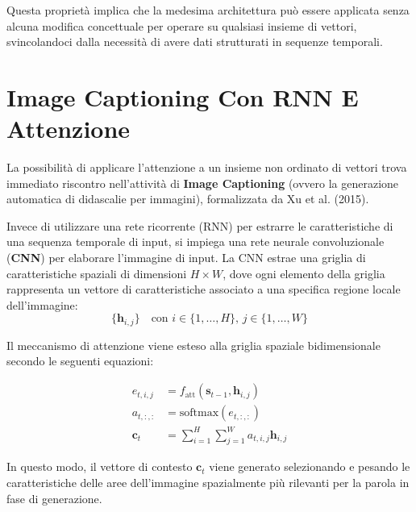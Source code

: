 ﻿\documentclass[11pt, a4paper]{article}
\begin{document}
Questa proprietà implica che la medesima architettura può essere applicata senza alcuna modifica concettuale per operare su qualsiasi insieme di vettori, svincolandoci dalla necessità di avere dati strutturati in sequenze temporali.

\newpage

\section{Image Captioning Con RNN E Attenzione}

La possibilità di applicare l'attenzione a un insieme non ordinato di vettori trova immediato riscontro nell'attività di \textbf{Image Captioning} (ovvero la generazione automatica di didascalie per immagini), formalizzata da Xu et al. (2015).

Invece di utilizzare una rete ricorrente (RNN) per estrarre le caratteristiche di una sequenza temporale di input, si impiega una rete neurale convoluzionale (\textbf{CNN}) per elaborare l'immagine di input. La CNN estrae una griglia di caratteristiche spaziali di dimensioni $H \times W$, dove ogni elemento della griglia rappresenta un vettore di caratteristiche associato a una specifica regione locale dell'immagine:
\[ \{\bm{h}_{i,j}\} \quad \text{con } i \in \{1,\dots,H\}, \, j \in \{1,\dots,W\} \]


Il meccanismo di attenzione viene esteso alla griglia spaziale bidimensionale secondo le seguenti equazioni:

\begin{align*}
e_{t,i,j} &= f_{\text{att}}(\bm{s}_{t-1}, \bm{h}_{i,j}) \\
a_{t,:,:} &= \text{softmax}(e_{t,:,:}) \\
\bm{c}_t &= \sum_{i=1}^{H} \sum_{j=1}^{W} a_{t,i,j} \bm{h}_{i,j}
\end{align*}

In questo modo, il vettore di contesto $\bm{c}_t$ viene generato selezionando e pesando le caratteristiche delle aree dell'immagine spazialmente più rilevanti per la parola in fase di generazione.

\end{document}
